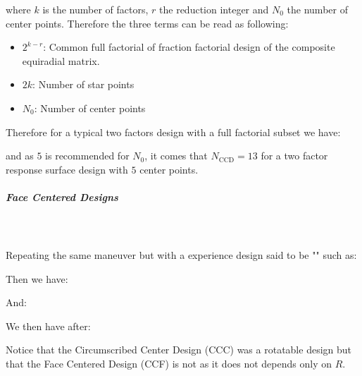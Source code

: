 	where $k$ is the number of factors, $r$ the reduction integer and $N_0$ the number of center points. Therefore the three terms can be read as following:
	\begin{itemize}
		\item $2^{k-r}$: Common full factorial of fraction factorial design of the  composite equiradial matrix.

		\item $2k$: Number of star points

		\item $N_0$: Number of center points
	\end{itemize}
	Therefore for a typical two factors design with a full factorial subset we have:
	
	and as $5$ is recommended for $N_0$, it comes that $N_{\text{CCD}}=13$ for a two factor response surface design with $5$ center points.
	
	\pagebreak
	\subparagraph{Face Centered Designs}\mbox{}\\\\
	Repeating the same maneuver but with a experience design said to be "" such as:
	
	Then we have:
	
	And:
	
	We then have after:
	
	Notice that the Circumscribed Center Design (CCC) was a rotatable design but that the Face Centered Design (CCF) is not as it does not depends only on $R$.
	
